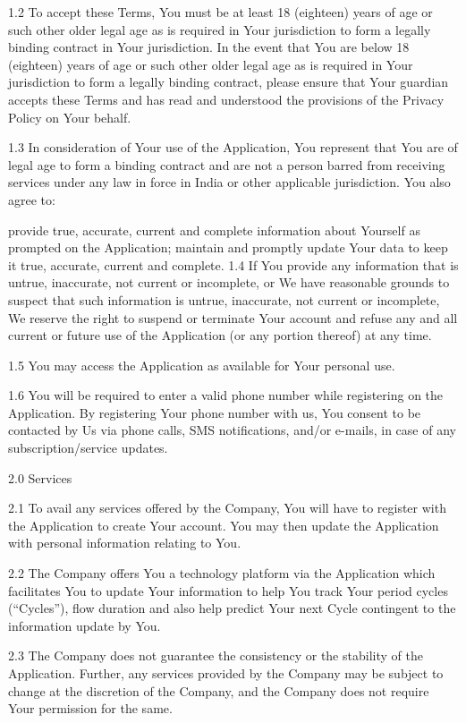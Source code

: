 1.2       To accept these Terms, You must be at least 18 (eighteen) years of age or such other older legal age as is required in Your jurisdiction to form a legally binding contract in Your jurisdiction. In the event that You are below 18 (eighteen) years of age or such other older legal age as is required in Your jurisdiction to form a legally binding contract, please ensure that Your guardian accepts these Terms and has read and understood the provisions of the Privacy Policy on Your behalf.

1.3        In consideration of Your use of the Application, You represent that You are of legal age to form a binding contract and are not a person barred from receiving services under any law in force in India or other applicable jurisdiction. You also agree to:

provide true, accurate, current and complete information about Yourself as prompted on the Application;
maintain and promptly update Your data to keep it true, accurate, current and complete.
1.4        If You provide any information that is untrue, inaccurate, not current or incomplete, or We have reasonable grounds to suspect that such information is untrue, inaccurate, not current or incomplete, We reserve the right to suspend or terminate Your account and refuse any and all current or future use of the Application (or any portion thereof) at any time.

1.5        You may access the Application as available for Your personal use.

1.6        You will be required to enter a valid phone number while registering on the Application. By registering Your phone number with us, You consent to be contacted by Us via phone calls, SMS notifications, and/or e-mails, in case of any subscription/service updates.

 

2.0       Services

2.1        To avail any services offered by the Company, You will have to register with the Application to create Your account. You may then update the Application with personal information relating to You.

2.2        The Company offers You a technology platform via the Application which facilitates You to update Your information to help You track Your period cycles (“Cycles”), flow duration and also help predict Your next Cycle contingent to the information update by You.

2.3        The Company does not guarantee the consistency or the stability of the Application. Further, any services provided by the Company may be subject to change at the discretion of the Company, and the Company does not require Your permission for the same.

